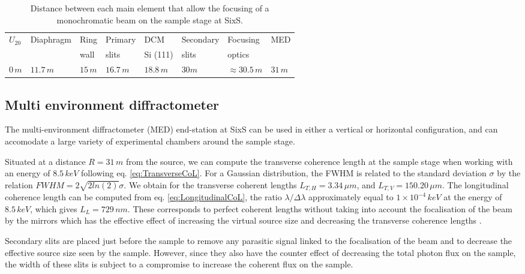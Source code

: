 \begin{table}[!htb]
	\centering
	\begin{tabular}{@{}llllllll@{}}
	\toprule
	$U_{20}$ & Diaphragm & Ring & Primary  & DCM      & Secondary  & Focusing &  MED \\
	         &           & wall & slits    & Si (111) & slits      & optics   &  \\
 	\midrule
 	$0 \, m$ &$11.7 \, m$&$15 \, m$& $16.7 \, m$ & $18.8 \, m$ & $ 30 m$ &$\approx 30.5 \,  m$ & $31 \, m$
	\end{tabular}
	\caption{
		Distance between each main element that allow the focusing of a monochromatic beam on the sample stage at SixS.
	}
    \label{tab:DistanceSixS}
\end{table}

\subsection{Multi environment diffractometer}

The multi-environment diffractometer (MED) end-station at SixS can be used in either a vertical or horizontal configuration, and can accomodate a large variety of experimental chambers around the sample stage.

Situated at a distance $R = 31 \, m$ from the source, we can compute the transverse coherence length at the sample stage when working with an energy of $8.5 \, keV$ following eq. \ref{eq:TransverseCoL}.
For a Gaussian distribution, the FWHM is related to the standard deviation $\sigma$ by the relation $FWHM = 2\sqrt{2 ln (2) } \sigma$.
We obtain for the transverse coherent lengths $L_{T,H} = 3.34 \, \mu m$, and $L_{T,V} = 150.20 \, \mu m$.
The longitudinal coherence length can be computed from eq. \ref{eq:LongitudinalCoL}, the ratio $\lambda/\Delta\lambda$ approximately equal to $1\times10^{-4} \, keV$ at the energy of $8.5 \, keV$, which gives $L_L = 729 \, nm$.
These corresponds to perfect coherent lengths without taking into account the focalisation of the beam by the mirrors which has the effective effect of increasing the virtual source size and decreasing the transverse coherence lengths \parencite{vincentjacques2010}.

Secondary slits are placed just before the sample to remove any parasitic signal linked to the focalisation of the beam and to decrease the effective source size seen by the sample.
However, since they also have the counter effect of decreasing the total photon flux on the sample, the width of these slits is subject to a compromise to increase the coherent flux on the sample.

